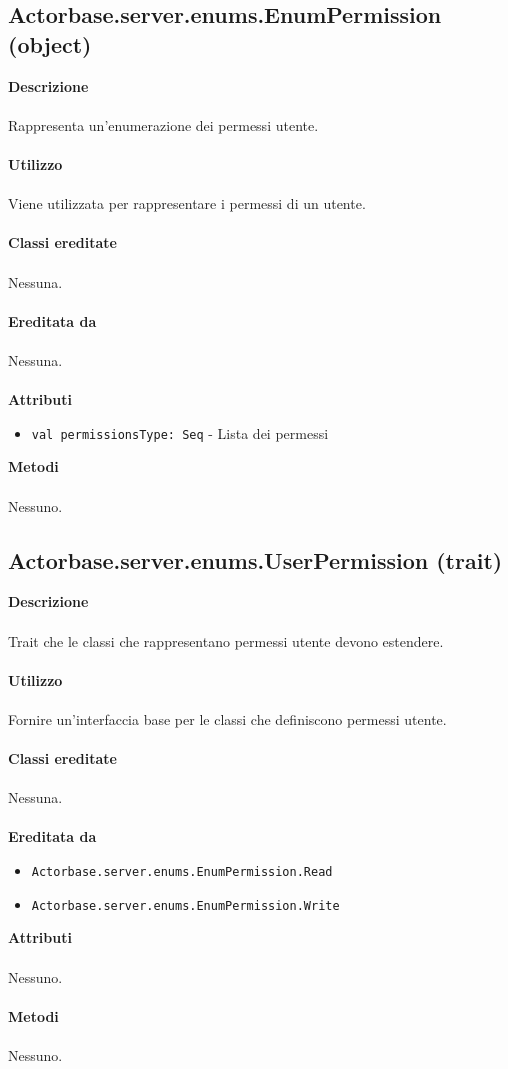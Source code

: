 \documentclass[a4paper]{article}
\begin{document}
		\subsection{Actorbase.server.enums.EnumPermission (object)}
		\textbf{Descrizione}
			\\ \\
			Rappresenta un'enumerazione dei permessi utente.
			\\ \\
		\textbf{Utilizzo}
			\\ \\
			Viene utilizzata per rappresentare i permessi di un utente.
			\\ \\
		\textbf{Classi ereditate}
		\\ \\
			Nessuna.
			\\ \\
		\textbf{Ereditata da}
		\\ \\
			Nessuna.
			\\ \\
		\textbf{Attributi}
			\begin{itemize}
				\item \texttt{val permissionsType: Seq}  - Lista dei permessi
			\end{itemize}
		\textbf{Metodi}
			\\ \\
			Nessuno.
		
	\subsection{Actorbase.server.enums.UserPermission (trait)}
		\textbf{Descrizione}
			\\ \\
			Trait che le classi che rappresentano permessi utente devono estendere.
			\\ \\
		\textbf{Utilizzo}
			\\ \\
			Fornire un'interfaccia base per le classi che definiscono permessi utente.
			\\ \\
		\textbf{Classi ereditate}
		\\ \\
		Nessuna.
		\\ \\
		\textbf{Ereditata da}
			\begin{itemize}
				\item \texttt{Actorbase.server.enums.EnumPermission.Read}
				\item \texttt{Actorbase.server.enums.EnumPermission.Write}
			\end{itemize}
		\textbf{Attributi}
		\\ \\
				Nessuno.
		\\ \\
		\textbf{Metodi}
			\\ \\
			Nessuno.
			
\end{document}
